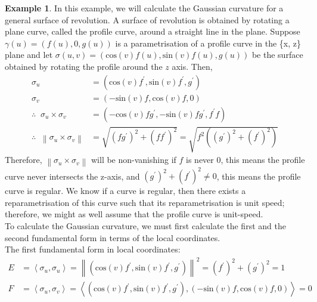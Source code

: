 \documentclass{article}
\theoremstyle{plain}
\theoremstyle{definition}
\newtheorem{example}{Example}
\theoremstyle{remark}
\begin{document}
\begin{example} \label{eg: Gaussian curvature of surface of revolution}
    In this example, we will calculate the Gaussian curvature for a general surface of revolution. A surface of revolution is obtained by rotating a plane curve, called the profile curve, around a straight line in the plane. Suppose \( \gamma(u) = (f(u),0,g(u))\) is a parametrisation of a profile curve in the \{x, z\} plane and let \( \sigma(u,v) = (\text{cos}(v)f(u), \text{sin}(v)f(u), g(u) )\) be the surface obtained by rotating the profile around the \(z\) axis. Then,
    \begin{align*}
        \sigma_u                                                          & = (\text{cos}(v)f^{\prime}, \text{sin}(v)f^{\prime}, g^{\prime} )                        \\
        \sigma_v                                                          & = (-\text{sin}(v)f, \text{cos}(v)f, 0)                                                   \\
        \therefore \; \; \sigma_u \times \sigma_v                         & = (-\text{cos}(v)fg^{\prime} , -\text{sin}(v)fg^{\prime}, f^{\prime} f)                  \\
        \therefore \; \; \left\lVert\sigma_u \times \sigma_v \right\rVert & = \sqrt{(fg^{\prime})^2 + (ff^{\prime})^2} = \sqrt{f^2((g^{\prime})^2 + (f^{\prime})^2)}
    \end{align*}
    Therefore, \( \left\lVert\sigma_u \times \sigma_v \right\rVert \) will be non-vanishing if \( f \) is never \(0\), this means the profile curve never intersects the z-axis, and \(  (g^{\prime})^2 + (f^{\prime})^2 \neq 0 \), this means the profile curve is regular. We know if a curve is regular, then there exists a reparametrisation of this curve such that its reparametrisation is unit speed; therefore, we might as well assume that the profile curve is unit-speed. \\
    To calculate the Gaussian curvature, we must first calculate the first and the second fundamental form in terms of the local coordinates. \\
    The first fundamental form in local coordinates:
    \begin{align*}
        E & = \left\langle \sigma_u , \sigma_u\right\rangle  = \left\lVert (\text{cos}(v)f^{\prime}, \text{sin}(v)f^{\prime}, g^{\prime} ) \right\rVert^2 = (f^{\prime})^2 + (g^{\prime})^2  = 1    \\
        F & = \left\langle \sigma_u, \sigma_v \right\rangle = \left\langle (\text{cos}(v)f^{\prime}, \text{sin}(v)f^{\prime}, g^{\prime} ), (-\text{sin}(v)f, \text{cos}(v)f, 0 ) \right\rangle = 0 \\

\end{align*}
\end{example}
\end{document}
